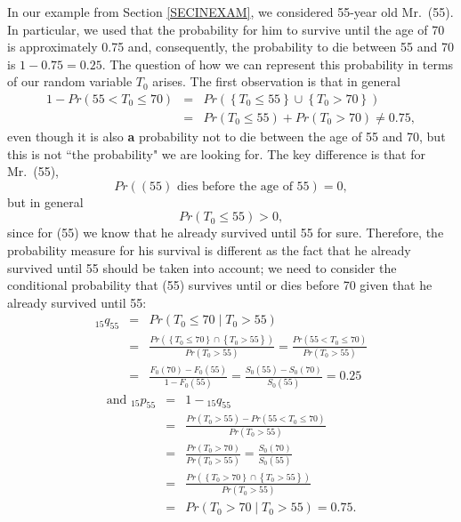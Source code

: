\documentclass[11pt,fleqn,oneside]{book}
\begin{document}
In our example from Section \ref{SECINEXAM}, we considered 55-year old Mr.\ (55). In particular, we used that the probability for him to survive until the age of 70 is approximately 0.75 and, consequently, the probability to die between 55 and 70 is $1-0.75=0.25$. The question of how we can represent this probability in terms of our random variable $T_0$ arises. The first observation is that in general
\begin{eqnarray*}
1- Pr(55 < T_0 \leq 70) &= &Pr\left(\left\{T_0 \leq 55\right\} \cup \left\{T_0>70\right\}\right)\\
& =& Pr(T_0 \leq 55) + Pr(T_0>70) \neq 0.75,
\end{eqnarray*}
even though it is also \textbf{a} probability not to die between the age of 55 and 70, but this is not ``the probability" we are looking for. The key difference is that for Mr.\ (55), 
$$
Pr\left((55) \text{ dies before the age of }55\right) = 0,
$$
but in general
$$
Pr(T_0 \leq 55) > 0,
$$
since for (55) we know that he already survived until 55 for sure. Therefore, the probability measure for his survival is different as the fact that he already survived until 55 should be taken into account; we need to consider the conditional probability that (55) survives until or dies before 70 given that he already survived until 55:
\begin{eqnarray*}
{_{15}q_{55}} &=& Pr(T_0 \leq 70 \mid T_0 > 55) \\
&=& \frac{Pr\left(\left\{T_0 \leq 70 \right\} \cap \left\{T_0 > 55 \right\}\right)}{Pr(T_0>55)} = \frac{Pr(55 < T_0 \leq 70)}{Pr(T_0>55)} \\
&=& \frac{F_0(70) - F_0(55)}{1 - F_0(55)} = \frac{S_0(55) - S_0(70)}{S_0(55)} = 0.25
\end{eqnarray*}
\begin{eqnarray*}
\text{and } {_{15}p_{55}} &=& 1 - {_{15}q_{55}}\\
&=& \frac{Pr(T_0>55) - Pr(55 < T_0 \leq 70)}{Pr(T_0>55)}\\
&=& \frac{Pr(T_0>70)}{Pr(T_0>55)} = \frac{S_0(70)}{S_0(55)}\\
&=& \frac{Pr\left(\left\{T_0>70\right\} \cap \left\{T_0>55\right\}\right)}{Pr(T_0>55)}\\
&=& Pr(T_0>70 \mid T_0> 55) = 0.75.
\end{eqnarray*}
\end{document}
